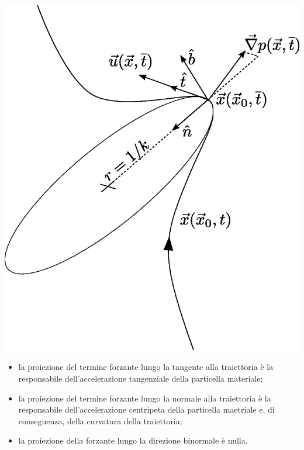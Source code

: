 \begin{minipage}{0.40\textwidth}
\begin{center}
   \includegraphics[width=1.0\textwidth]{./fig/frenet.eps}
\end{center}
\end{minipage}
\begin{itemize}
 \item la proiezione del termine forzante lungo la tangente alla traiettoria è la responsabile dell'accelerazione tangenziale della particella materiale;
 \item la proiezione del termine forzante lungo la normale alla traiettoria è la responsabile dell'accelerazione centripeta della particella maetriale e, di conseguenza, della curvatura della traiettoria;
 \item la proiezione della forzante lungo la direzione binormale è nulla.
\end{itemize}


